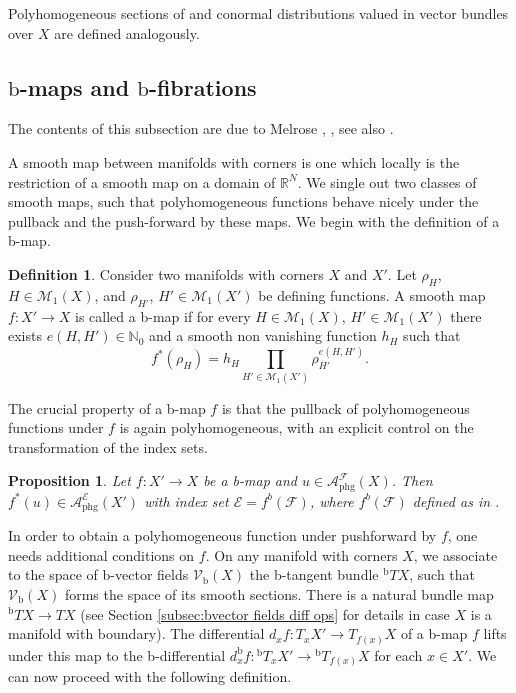 \documentclass[JEP,XML,SOM,Unicode,NoFloatCountersInSection,published]{cedram}
\theoremstyle{plain}
\newtheorem{Prop}[Th]{Proposition}
\theoremstyle{definition}
\newtheorem{defn}[Th]{Definition}
\newcommand\calM{{\mathcal M}}
\newcommand {\phg}{{\mathrm{phg}}}
\newcommand{\bb}{{\mathrm{b}}}
\begin{document}
Polyhomogeneous sections of and conormal distributions valued in vector bundles over $X$ are defined analogously.

\subsection{\texorpdfstring{$\bb$}{b}-maps and \texorpdfstring{$\bb$}{b}-fibrations}
The contents of this subsection are due to Melrose \cite{Mel:CCDMWC}, \cite{melrose1993atiyah}, see also
\cite[\S 2.A]{mazzeorafe1991elliptic}.

A smooth map between manifolds with corners is
one which locally is the restriction of a smooth map on a
domain of $\mathbb{R}^{N}$. We single out two classes of smooth maps,
such that polyhomogeneous functions behave nicely under the pullback and the push-forward
by these maps. We begin with the definition of a b-map.

\begin{defn} Consider two manifolds with corners $X$ and $X'$.
Let $\rho_H$, \hbox{$H\!\in\!\calM_1(X)$}, and $\rho_{H'}$, $H'\in\calM_1(X')$ be defining functions. A smooth map $f : X' \to X$ is called a b-map
if for every $H\in\calM_1(X)$, $H'\in\calM_1(X')$ there exists $e(H,H') \in \mathbb{N}_0$
and a smooth non vanishing function $h_H$ such that
\begin{equation} \label{hypb}
f^{*}(\rho_{H}) = h_H \prod_{H'\in\calM_1(X')} \rho_{H'}^{e(H,H')}.
\end{equation}
\end{defn}

The crucial property of a b-map $f$ is that the pullback of polyhomogeneous
functions under $f$ is again polyhomogeneous, with an explicit
control on the transformation of the index sets.

\begin{Prop}
Let $f : X' \to X $ be a b-map and
$ u \in \mathcal{A}_{\phg}^{\mathcal{F}}(X)$.
Then $f^{*}(u) \in \mathcal{A}_{\phg}^{\mathcal{E}}(X')$
with index set $\mathcal{E} = f^{b}(\mathcal{F})$,
where $f^{b}(\mathcal{F})$ defined as in
\cite[A12]{mazzeorafe1991elliptic}.
\end{Prop}

In order to obtain a polyhomogeneous function
under pushforward by $f$, one needs additional conditions on $f$.
On any manifold with corners $X$, we associate to the space of b-vector
fields $\mathcal{V}_\bb(X)$ the b-tangent bundle ${}^\bb TX$, such that $\mathcal{V}_\bb(X)$
forms the space of its smooth sections. There is a natural bundle map ${}^\bb TX\to TX$ (see Section \ref{subsec:bvector fields diff ops} for details in case $X$ is a manifold with boundary).
The differential
$d_{x}f: T_{x}X' \to T_{f(x)}X$ of a b-map $f$ lifts under this map to the b-differential $d^{\bb}_{x}f : {}^{\bb}T_{x} X' \to {}^\bb T_{f(x)} X$ for each $x \in X'$. We can now proceed with the following definition.
\end{document}
